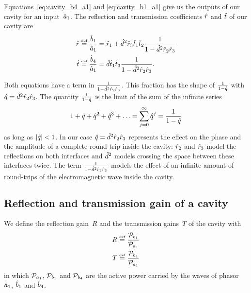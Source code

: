 Equations~\eqref{eq:cavity_b4_a1} and \eqref{eq:cavity_b1_a1} give us the outputs of our cavity for an input~$\hat{a}_1$.
The reflection and transmission coefficients $\hat{r}$ and $\hat{t}$ of our cavity are
\begin{subequations}
\begin{align}
    \hat{r} &\stackrel{\text{\tiny def}}{=}
    \frac{\hat{b}_1}{\hat{a}_1}
    =
    \hat{r}_1 + \hat{d}^2 \hat{r}_3 \hat{t}_1 \hat{t}_2
    \frac{1}{1 - \hat{d}^2 \hat{r}_2 \hat{r}_3}
    \label{eq:cavity_reflection_coefficient}
    \\
    \hat{t} &\stackrel{\text{\tiny def}}{=}
    \frac{\hat{b}_4}{\hat{a}_1}
    =
    \hat{d} \hat{t}_1 \hat{t}_3
    \frac{1}{1 - \hat{d}^2 \hat{r}_2 \hat{r}_3}
    \text{.}
    \label{eq:cavity_transmission_coefficient}
\end{align}
\end{subequations}

\begin{samepage}
Both equations have a term in $\frac{1}{1 - \hat{d}^2 \hat{r}_2 \hat{r}_3}$.
This fraction has the shape of $\frac{1}{1 - \hat{q}}$
with $\hat{q}=\hat{d}^2 \hat{r}_2 \hat{r}_3$.
The quantity $\frac{1}{1 - \hat{q}}$ is the limit of the sum of the infinite series
\begin{equation}
    1 + \hat{q} + \hat{q}^2 + \hat{q}^3 + \ldots
    =
    \sum_{j=0}^\infty \hat{q}^j
    =
    \frac{1}{1-\hat{q}}
    \label{eq:infinite_series}
\end{equation}
as long as $\abs{\cp{q}} < 1$.
In our case $\hat{q}=\hat{d}^2 \hat{r}_2 \hat{r}_3$ represents the effect on the phase and the amplitude of a complete round-trip inside the cavity: $\hat{r}_2$ and $\hat{r}_3$ model the reflections on both interfaces and $\hat{d}^2$ models crossing the space between these interfaces twice.
The term $\frac{1}{1 - \hat{d}^2 \hat{r}_2 \hat{r}_3}$ models the effect of an infinite amount of round-trips of the electromagnetic wave inside the cavity.
\end{samepage}





\subsection{Reflection and transmission gain of a cavity}

We define the reflection gain~$R$ and the transmission gains~$T$ of the cavity with
\begin{align}
    R &\stackrel{\text{\tiny def}}{=} \frac{\mathcal{P}_{b_1}}{\mathcal{P}_{a_1}} \\
    T &\stackrel{\text{\tiny def}}{=} \frac{\mathcal{P}_{b_4}}{\mathcal{P}_{a_1}}
\end{align}
in which $\mathcal{P}_{a_1}$, $\mathcal{P}_{b_1}$ and $\mathcal{P}_{b_4}$ are the active power carried by the waves of phasor $\hat{a}_1$, $\hat{b}_1$ and $\hat{b}_4$.

